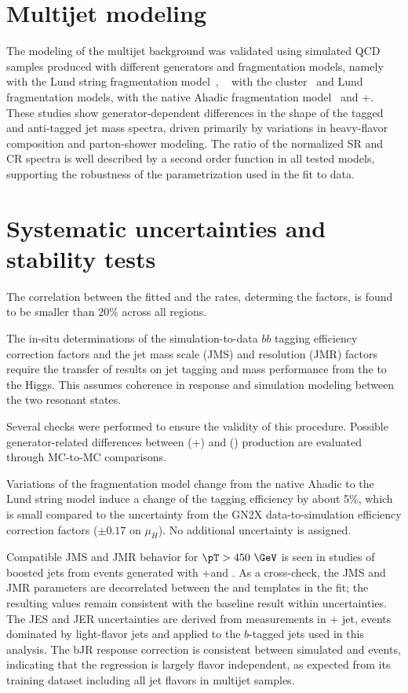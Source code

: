 \documentclass[PAPER, cernpreprint=true, atlasdraft=false, UKenglish, texmf, orcidlogo]{atlasdoc}
\begin{document}
\section{Multijet modeling}
The modeling of the multijet background was validated using simulated QCD samples produced with different generators and fragmentation models,  namely \PYTHIA[8] with the Lund string fragmentation model~\cite{Andersson:1983ia,Sjostrand:1984ic}, \HERWIG[7]~\cite{Bellm:2017jjp} with the cluster~\cite{Winter:2003tt} and Lund fragmentation models, \SHERPA with the native Ahadic fragmentation model~\cite{Winter:2003tt} and \POWHEG+\PYTHIA[8]. These studies show generator-dependent differences in the shape of the tagged and anti-tagged jet mass spectra, driven primarily by variations in heavy-flavor composition and parton-shower modeling. The ratio of the normalized SR and CR spectra is well described by a second order function in all tested models, supporting the robustness of the parametrization used in the fit to data.

\section{Systematic uncertainties and stability tests}

The correlation between the fitted \muH and the \Zbb rates, determing the \KGNTX factors, is found to be smaller than $20\%$ across all regions.

The in-situ determinations of the simulation-to-data $bb$ tagging efficiency correction factors \KGNTX and the jet mass scale (JMS) and resolution (JMR) factors require the transfer of results on jet tagging and mass performance from the \Zboson to the Higgs. This assumes coherence in response and simulation modeling between the two resonant states.




Several checks were performed to ensure the validity of this procedure. Possible generator-related differences between \Hbb (\POWHEG+\PYTHIA) and \Zbb (\SHERPA) production are evaluated through MC-to-MC comparisons.

Variations of the \SHERPA fragmentation model change from the native Ahadic to the Lund string model induce a change of the \Zbb tagging efficiency by about 5\%, which is small compared to the uncertainty from the GN2X data-to-simulation efficiency correction factors ($\pm0.17$ on $\mu_H$). No additional uncertainty is assigned.

Compatible JMS and JMR behavior for $\pT>450~\GeV$ is seen in studies of boosted \Wqq jets from \ttbar events generated with \POWHEG+\PYTHIA and \SHERPA. As a cross-check, the JMS and JMR parameters are decorrelated between the \Zbb and \Hbb templates in the fit; the resulting \muH values remain consistent with the baseline result within uncertainties.
The JES and JER uncertainties are derived from measurements in \Zboson $+$ jet, \Zmm events dominated by light-flavor jets and applied to the $b$-tagged jets used in this analysis. The bJR response correction is consistent between simulated \Zqq and \Zbb events, indicating that the regression is largely flavor independent, as expected from its training dataset including all jet flavors in multijet samples.
\end{document}
